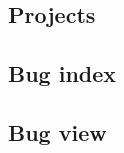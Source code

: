 \documentclass[11pt,english]{article}
\begin{document}
  \subsection{Projects}
  \begin{center}
  \end{center}

  \subsection{Bug index}
  \begin{center}
  \end{center}

  \subsection{Bug view}
  \begin{center}
  \end{center}
\end{document}

